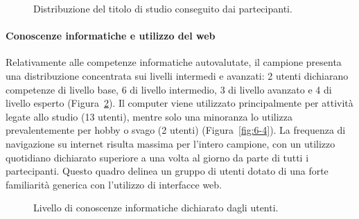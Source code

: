 \begin{figure}[H]
	\centering
	\caption{Distribuzione del titolo di studio conseguito dai partecipanti.}
	\label{fig:6-2}
\end{figure}

\paragraph{Conoscenze informatiche e utilizzo del web}
Relativamente alle competenze informatiche autovalutate, il campione presenta una distribuzione concentrata sui livelli intermedi e avanzati: 2 utenti dichiarano competenze di livello base, 6 di livello intermedio, 3 di livello avanzato e 4 di livello esperto (Figura~\ref{fig:6-3}). Il computer viene utilizzato principalmente per attività legate allo studio (13 utenti), mentre solo una minoranza lo utilizza prevalentemente per hobby o svago (2 utenti) (Figura~\ref{fig:6-4}). La frequenza di navigazione su internet risulta massima per l'intero campione, con un utilizzo quotidiano dichiarato superiore a una volta al giorno da parte di tutti i partecipanti. Questo quadro delinea un gruppo di utenti dotato di una forte familiarità generica con l'utilizzo di interfacce web.

\begin{figure}[H]
	\centering
	\caption{Livello di conoscenze informatiche dichiarato dagli utenti.}
	\label{fig:6-3}
\end{figure}

